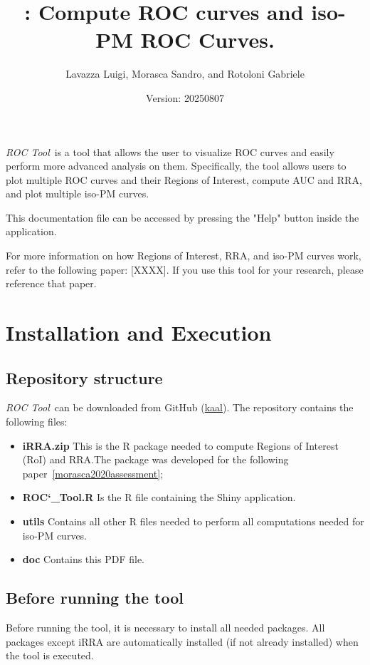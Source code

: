 \documentclass{article}
\title{\toolname: Compute ROC curves and iso-PM ROC Curves.}
\author{Lavazza Luigi, Morasca Sandro, and Rotoloni Gabriele}
\date{Version: 20250807}
\newcommand{\toolnameITB}{\textit{ROC Tool}~}
\newcommand{\mainfilenameNO}{ROC\char`_Tool.R}
\begin{document}
	
	\maketitle
	
	\toolnameITB is a tool that allows the user to visualize ROC curves and easily perform more advanced analysis on them. Specifically, the tool allows users to plot multiple ROC curves and their Regions of Interest, compute AUC and RRA, and plot multiple iso-PM curves.
	
	This documentation file can be accessed by pressing the "Help" button inside the application.
	
	For more information on how Regions of Interest, RRA, and iso-PM curves work, refer to the following paper: [XXXX]. If you use this tool for your research, please reference that paper.
	
	\newpage
	
	\tableofcontents
	
	\newpage
	
	\section{Installation and Execution}
	
	\subsection{Repository structure}
	\toolnameITB can be downloaded from GitHub (\url{kaal}). The repository contains the following files:
	\begin{itemize}
		\item \textbf{iRRA.zip} This is the R package needed to compute Regions of Interest (RoI) and RRA.The package was developed for the following paper~\ref{morasca2020assessment};
		\item \textbf{\mainfilenameNO} Is the R file containing the Shiny application.
		\item \textbf{utils} Contains all other R files needed to perform all computations needed for iso-PM curves.
		\item \textbf{doc} Contains this PDF file.
	\end{itemize}
	
	\subsection{Before running the tool}
	Before running the tool, it is necessary to install all needed packages.
	All packages except iRRA are automatically installed (if not already installed) when the tool is executed.
	
\end{document}

